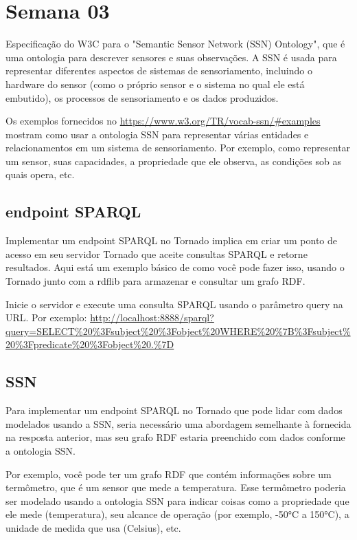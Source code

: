 \section{Semana 03}


Especificação do W3C para o "Semantic Sensor Network (SSN) Ontology", que é uma ontologia para descrever sensores e suas observações. A SSN é usada para representar diferentes aspectos de sistemas de sensoriamento, incluindo o hardware do sensor (como o próprio sensor e o sistema no qual ele está embutido), os processos de sensoriamento e os dados produzidos.

Os exemplos fornecidos no \url{https://www.w3.org/TR/vocab-ssn/#examples} mostram como usar a ontologia SSN para representar várias entidades e relacionamentos em um sistema de sensoriamento. Por exemplo, como representar um sensor, suas capacidades, a propriedade que ele observa, as condições sob as quais opera, etc.

\subsection{endpoint SPARQL}

Implementar um endpoint SPARQL no Tornado implica em criar um ponto de acesso em seu servidor Tornado que aceite consultas SPARQL e retorne resultados. Aqui está um exemplo básico de como você pode fazer isso, usando o Tornado junto com a rdflib para armazenar e consultar um grafo RDF.

Inicie o servidor e execute uma consulta SPARQL usando o parâmetro query na URL. Por exemplo: \url{http://localhost:8888/sparql?query=SELECT%20%3Fsubject%20%3Fobject%20WHERE%20%7B%3Fsubject%20%3Fpredicate%20%3Fobject%20.%7D}

\subsection{SSN}

Para implementar um endpoint SPARQL no Tornado que pode lidar com dados modelados usando a SSN, seria necessário uma abordagem semelhante à fornecida na resposta anterior, mas seu grafo RDF estaria preenchido com dados conforme a ontologia SSN.

Por exemplo, você pode ter um grafo RDF que contém informações sobre um termômetro, que é um sensor que mede a temperatura. Esse termômetro poderia ser modelado usando a ontologia SSN para indicar coisas como a propriedade que ele mede (temperatura), seu alcance de operação (por exemplo, -50°C a 150°C), a unidade de medida que usa (Celsius), etc.

